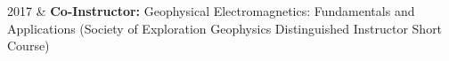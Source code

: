 \documentclass[a4paper, 11pt]{article}
\begin{document}
\begin{entryright}
    2017 & \textbf{Co-Instructor:} Geophysical Electromagnetics: Fundamentals and Applications (Society of Exploration Geophysics Distinguished Instructor Short Course)\\
\end{entryright}
\end{document}
